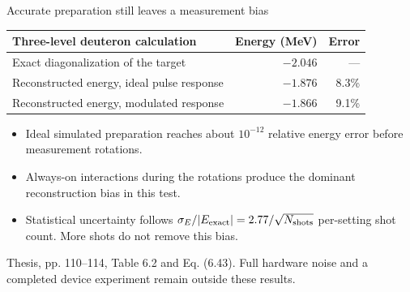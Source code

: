 \documentclass[11pt,aspectratio=169]{beamer}
\newcommand{\src}[1]{\par\vfill{\fontsize{7}{8}\selectfont\color{gray}#1\par}}
\begin{document}
\begin{frame}{Accurate preparation still leaves a measurement bias}
\renewcommand{\arraystretch}{1.25}
\begin{tabular}{@{}p{}rr@{}}\toprule
\textbf{Three-level deuteron calculation}&\textbf{Energy (MeV)}&\textbf{Error}\\\midrule
Exact diagonalization of the target&$-2.046$&---\\
Reconstructed energy, ideal pulse response&$-1.876$&8.3\%\\
Reconstructed energy, modulated response&$-1.866$&9.1\%\\\bottomrule
\end{tabular}\par
\medskip
\begin{itemize}\setlength\itemsep{.5em}
\item Ideal simulated preparation reaches about $10^{-12}$ relative energy error before measurement rotations.
\item Always-on interactions during the rotations produce the dominant reconstruction bias in this test.
\item Statistical uncertainty follows $\sigma_E/|E_{\rm exact}|=2.77/\sqrt{N_{\rm shots}}$ per-setting shot count. More shots do not remove this bias.
\end{itemize}
\src{Thesis, pp. 110--114, Table 6.2 and Eq. (6.43). Full hardware noise and a completed device experiment remain outside these results.}
\end{frame}
\end{document}

